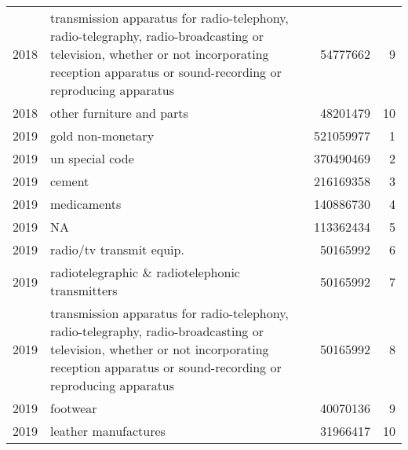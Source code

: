\begin{longtable}{rlrr}
2018 & transmission apparatus for radio-telephony, radio-telegraphy, radio-broadcasting or television, whether or not incorporating reception apparatus or sound-recording or reproducing apparatus & 54777662 & 9 \\ 
2018 & other furniture and parts & 48201479 & 10 \\ 
2019 & gold non-monetary & 521059977 & 1 \\ 
2019 & un special code & 370490469 & 2 \\ 
2019 & cement & 216169358 & 3 \\ 
2019 & medicaments & 140886730 & 4 \\ 
2019 & NA & 113362434 & 5 \\ 
2019 & radio/tv transmit equip. & 50165992 & 6 \\ 
2019 & radiotelegraphic \& radiotelephonic transmitters & 50165992 & 7 \\ 
2019 & transmission apparatus for radio-telephony, radio-telegraphy, radio-broadcasting or television, whether or not incorporating reception apparatus or sound-recording or reproducing apparatus & 50165992 & 8 \\ 
2019 & footwear & 40070136 & 9 \\ 
2019 & leather manufactures & 31966417 & 10 \\ 
 \bottomrule
\end{longtable}

